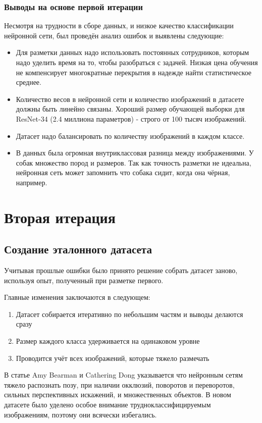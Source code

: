 \subsubsection{Выводы на основе первой итерации}
Несмотря на трудности в сборе данных, и низкое качество классификации нейронной сети, был проведён анализ ошибок и выявлены следующие:
\begin{itemize}
    \item Для разметки данных надо использовать постоянных сотрудников, которым надо уделить время на то, чтобы разобраться с задачей. Низкая цена обучения не компенсирует многократные перекрытия в надежде найти статистическое среднее.
    \item Количество весов в нейронной сети и количество изображений в датасете должны быть линейно связаны. Хороший размер обучающей выборки для ResNet-34 (2.4 миллиона параметров) - строго от 100 тысяч изображений.
    \item Датасет надо балансировать по количеству изображений в каждом классе.
    \item В данных была огромная внутриклассовая разница между изображениями. У собак множество пород и размеров. Так как точность разметки не идеальна, нейронная сеть может запомнить что собака сидит, когда она чёрная, например. 
\end{itemize}{}

\section{Вторая итерация}

\subsection{Создание эталонного датасета} \label{subsect3_1_2}
Учитывая прошлые ошибки было принято решение собрать датасет заново, используя опыт, полученный при разметке первого.

Главные изменения заключаются в следующем:
\begin{enumerate}
    \item Датасет собирается итеративно по небольшим частям и выводы делаются сразу
    \item Размер каждого класса удерживается на одинаковом уровне
    \item Проводится учёт всех изображений, которые тяжело размечать
\end{enumerate}{}

В статье Amy Bearman и Cathering Dong \cite{Bearman2015HumanPE} указывается что нейронным сетям тяжело распознать позу, при наличии окклюзий, поворотов и переворотов, сильных перспективных искажений, и множественных объектов. В новом датасете было уделено особое внимание трудноклассифицируемым изображениям, поэтому они всячески избегались.

